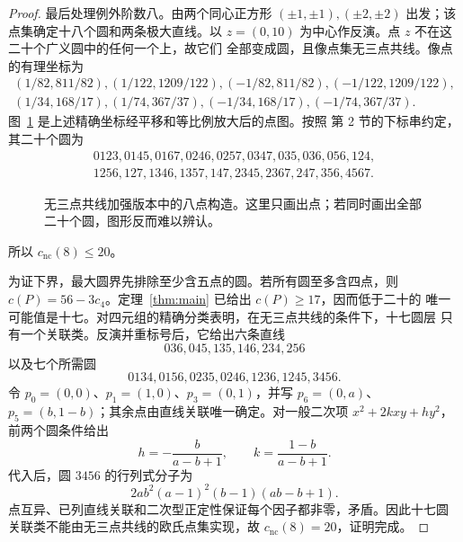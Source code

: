 \documentclass[11pt,a4paper]{ctexart}
\theoremstyle{definition}
\begin{document}
\begin{proof}
最后处理例外阶数八。由两个同心正方形
$(\pm1,\pm1),(\pm2,\pm2)$ 出发；该点集确定十八个圆和两条极大直线。以
$z=(0,10)$ 为中心作反演。点 $z$ 不在这二十个广义圆中的任何一个上，故它们
全部变成圆，且像点集无三点共线。像点的有理坐标为
\[
\begin{gathered}
(1/82,811/82),(1/122,1209/122),(-1/82,811/82),(-1/122,1209/122),\\
(1/34,168/17),(1/74,367/37),(-1/34,168/17),(-1/74,367/37).
\end{gathered}
\]
图~\ref{fig:no-three-eight} 是上述精确坐标经平移和等比例放大后的点图。按照
第 2 节的下标串约定，其二十个圆为
\begin{gather*}
0123,0145,0167,0246,0257,0347,035,036,056,124,\\
1256,127,1346,1357,147,2345,2367,247,356,4567.
\end{gather*}
\begin{figure}[ht]
\centering
{}
\caption{无三点共线加强版本中的八点构造。这里只画出点；若同时画出全部
二十个圆，图形反而难以辨认。}
\label{fig:no-three-eight}
\end{figure}
所以 $c_{\mathrm{nc}}(8)\le20$。

为证下界，最大圆界先排除至少含五点的圆。若所有圆至多含四点，则
$c(P)=56-3c_4$。定理~\ref{thm:main} 已给出 $c(P)\ge17$，因而低于二十的
唯一可能值是十七。对四元组的精确分类表明，在无三点共线的条件下，十七圆层
只有一个关联类。反演并重标号后，它给出六条直线
\[
036,045,135,146,234,256
\]
以及七个所需圆
\[
0134,0156,0235,0246,1236,1245,3456.
\]
令 $p_0=(0,0)$、$p_1=(1,0)$、$p_3=(0,1)$，并写
$p_6=(0,a)$、$p_5=(b,1-b)$；其余点由直线关联唯一确定。对一般二次项
$x^2+2kxy+hy^2$，前两个圆条件给出
\[
h=-\frac{b}{a-b+1},\qquad k=\frac{1-b}{a-b+1}.
\]
代入后，圆 $3456$ 的行列式分子为
\[
2ab^2(a-1)^2(b-1)(ab-b+1).
\]
点互异、已列直线关联和二次型正定性保证每个因子都非零，矛盾。因此十七圆
关联类不能由无三点共线的欧氏点集实现，故 $c_{\mathrm{nc}}(8)=20$，证明完成。
\end{proof}
\end{document}
